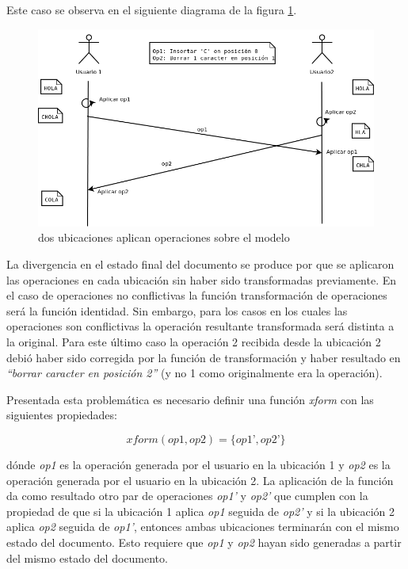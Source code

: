 \documentclass[12pt,a4paper]{article}
\begin{document}
	Este caso se observa en el siguiente diagrama de la figura \ref{secuencia_ops_2}.
	
	\begin{figure}[!ht]
		\begin{center}
			\includegraphics[width=14cm]{sincronizacion_fallida.png}
			\caption{\label{secuencia_ops_2} dos ubicaciones aplican operaciones sobre el modelo }
		\end{center}
	\end{figure}


	La divergencia en el estado final del documento se produce por que se aplicaron las operaciones en cada 
	ubicación sin haber sido transformadas previamente. En el caso de operaciones no conflictivas la función
	transformación de operaciones será la función  identidad. Sin embargo, para los casos en los cuales las
	operaciones son conflictivas la operación resultante transformada será distinta a la original.
	Para este último caso la operación 2 recibida desde la ubicación 2 debió haber sido corregida por la función
	de transformación y haber resultado en \textit{“borrar caracter en posición 2”} (y no 1 como originalmente
	era la operación).
	
	Presentada esta problemática es necesario definir una función \textit{xform} con las siguientes propiedades:
	
	\begin{equation} xform(op1,op2) = \lbrace op1’,op2’ \rbrace
	\end{equation}

	dónde \textit{op1} es la operación generada por el usuario en la ubicación 1 y \textit{op2} es la operación
	generada por el usuario en la ubicación 2. La aplicación de la función da como resultado otro par de operaciones
	\textit{op1’} y \textit{op2’} que cumplen con la propiedad de que si la ubicación 1 aplica \textit{op1} seguida
	de  \textit{op2’}  y si la ubicación 2 aplica \textit{op2} seguida de \textit{op1’}, entonces ambas
	ubicaciones terminarán con el mismo estado del documento.
	Esto requiere que \textit{op1} y \textit{op2} hayan sido generadas a partir del mismo estado del documento.
\end{document}
